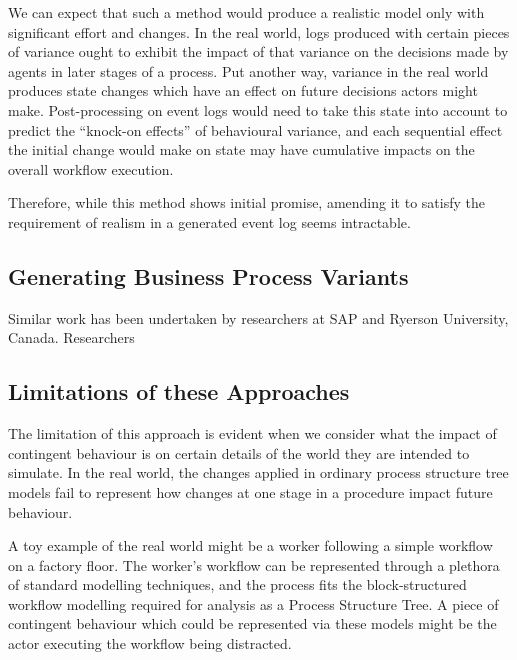 \documentclass[12pt,draft]{article}
\begin{document}
We can expect that such a method would produce a realistic model only with
significant effort and changes. In the real world, logs produced with certain
pieces of variance ought to exhibit the impact of that variance on the decisions
made by agents in later stages of a process. Put another way, variance in the
real world produces state changes which have an effect on future decisions
actors might make. Post-processing on event logs would need to take this state
into account to predict the ``knock-on effects'' of behavioural variance, and
each sequential effect the initial change would make on state may have
cumulative impacts on the overall workflow execution.
\par

Therefore, while this method shows initial promise, amending it to satisfy the
requirement of realism in a generated event log seems intractable.
\par

\subsection{Generating Business Process Variants}  %
Similar work has been undertaken by researchers at SAP and Ryerson University,
Canada. Researchers 

\subsection{Limitations of these Approaches}
\label{subsec:existing_work_limitations}

The limitation of this
approach is evident when we consider what the impact of contingent behaviour is
on certain details of the world they are intended to simulate. In the real
world, the changes applied in ordinary process structure tree models fail to
represent how changes at one stage in a procedure impact future behaviour.\par

A toy example of the real world might be a worker following a simple workflow on
a factory floor. The worker's workflow can be represented through a plethora of
standard modelling techniques, and the process fits the block-structured
workflow modelling required for analysis as a Process Structure Tree. A piece of
contingent behaviour which could be represented via these models might be the
actor executing the workflow being distracted.\par
\end{document}
